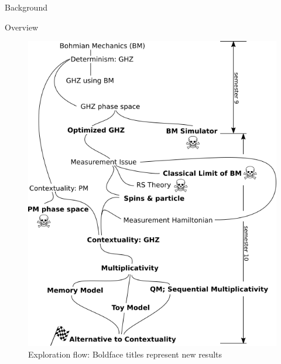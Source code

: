 \documentclass[final,hyperref={pdfpagelabels=false}]{beamer}
\begin{document}
\begin{frame}[t]
\begin{columns}[c]
\begin{column}{.32\textwidth}
\begin{block}{Background}

      \end{block}

      
      \begin{block}{Overview}

            \begin{figure}
              \includegraphics[width=0.99\linewidth]{flow.png}
              \caption{Exploration flow: Boldface titles represent new results}
            \end{figure}
        


\end{block}
\end{column}
\end{columns}
\end{frame}
\end{document}
